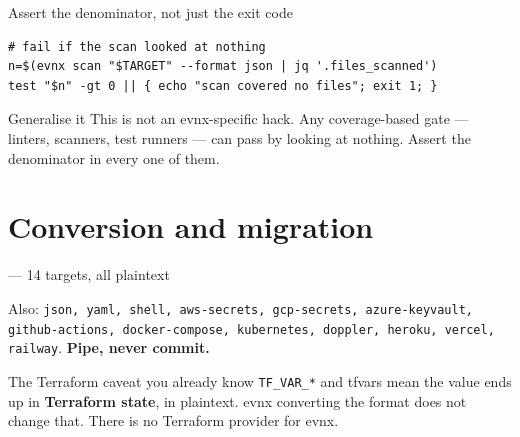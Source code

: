 \documentclass[aspectratio=169,10pt]{beamer}
\begin{document}
\begin{frame}[fragile]{Assert the denominator, not just the exit code}
  \vspace{-0.2em}
\begin{lstlisting}[style=evnxcode]
# fail if the scan looked at nothing
n=$(evnx scan "$TARGET" --format json | jq '.files_scanned')
test "$n" -gt 0 || { echo "scan covered no files"; exit 1; }
\end{lstlisting}

  \vspace{0.8em}
  \begin{block}{Generalise it}
    This is not an evnx-specific hack. Any coverage-based gate --- linters,
    scanners, test runners --- can pass by looking at nothing. Assert the
    denominator in every one of them.
  \end{block}

\end{frame}

\section{Conversion and migration}

\begin{frame}[fragile]{ --- 14 targets, all plaintext}

  \vspace{0.3em}
  {\footnotesize Also: \texttt{json, yaml, shell, aws-secrets, gcp-secrets,
  azure-keyvault, github-actions, docker-compose, kubernetes, doppler, heroku,
  vercel, railway}. \textbf{Pipe, never commit.}}

  \vspace{0.4em}
  \begin{trap}{The Terraform caveat you already know}
    \texttt{TF\_VAR\_*} and tfvars mean the value ends up in
    \textbf{Terraform state}, in plaintext. evnx converting the format does not
    change that. There is no Terraform provider for evnx.
  \end{trap}
\end{frame}
\end{document}
